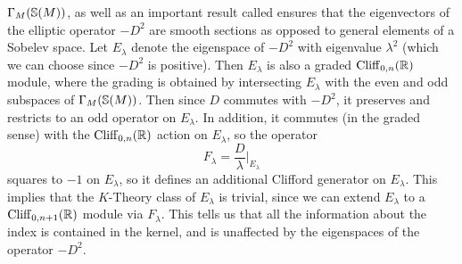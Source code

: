 $\Gamma_M(\S(M))$, as well as an important result called  ensures that the eigenvectors of the elliptic operator $-D^2$ are smooth
sections as opposed to general elements of a Sobelev space. Let $E_\lambda$ denote the
eigenspace of $-D^2$ with eigenvalue $\lambda^2$
(which we can choose since $-D^2$ is positive). Then $E_\lambda$ is also a graded
$\Cliff_{0,n}(\R)$ module, where the grading is obtained by intersecting $E_\lambda$
with the even and odd subspaces of $\Gamma_M(\S(M))$. Then since $D$ commutes with
$-D^2$, it preserves and restricts to an odd operator on $E_\lambda$. In addition,
it commutes (in the graded sense) with the $\Cliff_{0,n}(\R)$ action on $E_\lambda$,
so the operator
\[
F_\lambda = \frac{D}{\lambda}\bigg\vert_{E_\lambda}
\]
squares to $-1$ on $E_\lambda$, so it defines an additional Clifford generator on
$E_\lambda$. This implies that the $K$-Theory class of $E_\lambda$ is trivial, since
we can extend $E_\lambda$ to a $\Cliff_{0, n+1}(\R)$ module via $F_\lambda$. This
tells us that all the information about the index is contained in the kernel, and is
unaffected by the eigenspaces of the operator $-D^2$.
%